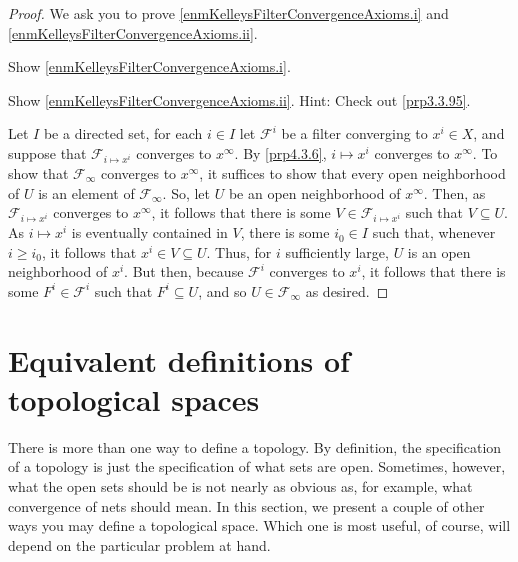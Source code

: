 \begin{prp}
\begin{savenotes}
\begin{rmk}
\end{rmk}
\begin{proof}
We ask you to prove \ref{enmKelleysFilterConvergenceAxioms.i} and \ref{enmKelleysFilterConvergenceAxioms.ii}.
\begin{exr}
Show \ref{enmKelleysFilterConvergenceAxioms.i}.
\end{exr}
\begin{exr}
Show \ref{enmKelleysFilterConvergenceAxioms.ii}.  Hint:  Check out \cref{prp3.3.95}.
\end{exr}
Let $I$ be a directed set, for each $i\in I$ let $\mathcal{F}^i$ be a filter converging to $x^i\in X$, and suppose that $\mathcal{F}_{i\mapsto x^i}$ converges to $x^\infty$.  By \cref{prp4.3.6}, $i\mapsto x^i$ converges to $x^\infty$.  To show that $\mathcal{F}_\infty$ converges to $x^\infty$, it suffices to show that every open neighborhood of $U$ is an element of $\mathcal{F}_\infty$.  So, let $U$ be an open neighborhood of $x^\infty$.  Then, as $\mathcal{F}_{i\mapsto x^i}$ converges to $x^\infty$, it follows that there is some $V\in \mathcal{F}_{i\mapsto x^i}$ such that $V\subseteq U$.  As $i\mapsto x^i$ is eventually contained in $V$, there is some $i_0\in I$ such that, whenever $i\geq i_0$, it follows that $x^i\in V\subseteq U$.  Thus, for $i$ sufficiently large, $U$ is an open neighborhood of $x^i$.  But then, because $\mathcal{F}^i$ converges to $x^i$, it follows that there is some $F^i\in \mathcal{F}^i$ such that $F^i\subseteq U$, and so $U\in \mathcal{F}_{\infty}$ as desired.
\end{proof}
\end{savenotes}
\end{prp}

\section{Equivalent definitions of topological spaces}

There is more than one way to define a topology.  By definition, the specification of a topology is just the specification of what sets are open.  Sometimes, however, what the open sets should be is not nearly as obvious as, for example, what convergence of nets should mean.  In this section, we present a couple of other ways you may define a topological space.  Which one is most useful, of course, will depend on the particular problem at hand.

